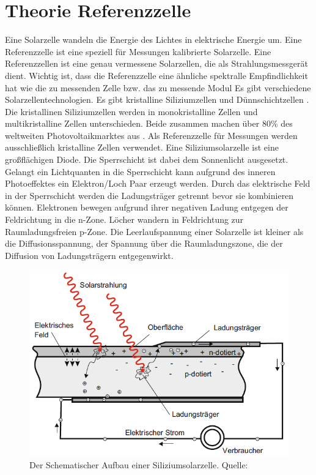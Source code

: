 \documentclass[a4paper,bibtotoc,oneside]{scrbook}
\begin{document}
\section{Theorie Referenzzelle}\thispagestyle{empty}
Eine Solarzelle wandeln die Energie des Lichtes in elektrische Energie um. Eine Referenzzelle ist eine speziell für Messungen kalibrierte Solarzelle. Eine Referenzzellen ist eine genau vermessene Solarzellen, die als Strahlungsmessgerät dient. Wichtig ist, dass die Referenzzelle eine ähnliche spektralle Empfindlichkeit hat wie die zu messenden Zelle bzw. das zu messende Modul
Es gibt verschiedene Solarzellentechnologien. Es gibt kristalline Siliziumzellen und Dünnschichtzellen . Die kristallinen Siliziumzellen werden in monokristalline Zellen und multikristalline Zellen unterschieden. Beide zusammen machen über 80\% des weltweiten Photovoltaikmarktes aus \cite{iea00}. Als Referenzzelle für Messungen werden ausschließlich kristalline Zellen verwendet. 
Eine Siliziumsolarzelle ist eine großflächigen Diode. Die Sperrschicht ist dabei dem Sonnenlicht ausgesetzt. Gelangt ein Lichtquanten in die Sperrschicht kann aufgrund des inneren Photoeffektes ein Elektron/Loch Paar erzeugt werden. Durch das elektrische Feld in der Sperrschicht werden die Ladungsträger getrennt bevor sie kombinieren können. Elektronen bewegen aufgrund ihrer negativen Ladung entgegen der Feldrichtung in die n-Zone. Löcher wandern in Feldrichtung zur Raumladungsfreien p-Zone. Die Leerlaufspannung einer Solarzelle ist kleiner als die Diffusionsspannung, der Spannung über die Raumladungszone, die der Diffusion von Ladungsträgern entgegenwirkt.
\begin{figure}[htbp]
\centering
\includegraphics[width=125mm]{img/zelle.png}
\caption{Der Schematischer Aufbau einer Siliziumsolarzelle. Quelle: \cite{pv}}\label{cell}
\end{figure}
\end{document}
